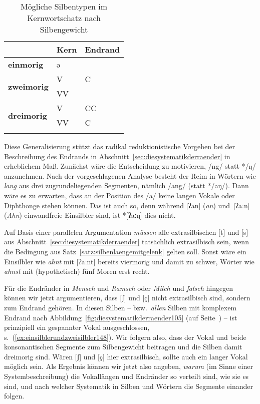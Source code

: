 \begin{table}[!htbp]
  \centering
  \begin{tabular}{lll}
    \lsptoprule
     & \textbf{Kern} & \textbf{Endrand} \\
    \midrule
    \textbf{einmorig} & ə & \\
    \midrule
    \multirow{2}{*}{\textbf{zweimorig}} & V & C \\
    & VV & \\
    \midrule
    \multirow{2}{*}{\textbf{dreimorig}} & V & CC \\
    & VV & C \\
    \lspbottomrule
  \end{tabular}
  \caption{Mögliche Silbentypen im Kernwortschatz nach Silbengewicht}
  \label{tab:einsilblerundzweisilbler147}
\end{table}

\Np

Diese Generalisierung stützt das radikal reduktionistische Vorgehen bei der Beschreibung des Endrands in Abschnitt~\ref{sec:diesystematikderraender} in erheblichem Maß.
Zunächst wäre die Entscheidung zu motivieren, /ng/ statt */ŋ/ anzunehmen.
Nach der vorgeschlagenen Analyse besteht der Reim in Wörtern wie \textit{lang} aus drei zugrundeliegenden Segmenten, nämlich /ang/ (statt */aŋ/).
Dann wäre es zu erwarten, dass an der Position des /a/ keine langen Vokale oder Diphthonge stehen können.
Das ist auch so, denn während [ʔan] (\textit{an}) und\ [ʔaːn] (\textit{Ahn}) einwandfreie Einsilbler sind, ist *[ʔaːŋ] dies nicht.

Auf Basis einer parallelen Argumentation \textit{müssen} alle extrasilbischen [t] und [s] aus Abschnitt~\ref{sec:diesystematikderraender} tatsächlich extrasilbisch sein, wenn die Bedingung aus Satz~\ref{satz:silbenlaengemitgelenk} gelten soll.
Sonst wäre ein Einsilbler wie \textit{ahnt} mit [ʔaːnt] bereits viermorig und damit zu schwer, Wörter wie \textit{ahnst} mit (hypothetisch) fünf Moren erst recht.

Für die Endränder in \textit{Mensch} und \textit{Ramsch} oder \textit{Milch} und \textit{falsch} hingegen können wir jetzt argumentieren, dass [ʃ] und [ç] nicht extrasilbisch sind, sondern zum Endrand gehören.
In diesen Silben -- bzw.\ \textit{allen} Silben mit komplexem Endrand nach Abbildung~\ref{fig:diesystematikderraender105} (auf Seite~\pageref{fig:diesystematikderraender105}) -- ist prinzipiell ein gespannter Vokal ausgeschlossen, s.\ (\ref{ex:einsilblerundzweisilbler148}).
Wir folgern also, dass der Vokal und beide konsonantischen Segmente zum Silbengewicht beitragen und die Silben damit dreimorig sind.
Wären [ʃ] und [ç] hier extrasilbisch, sollte auch ein langer Vokal möglich sein.
Als Ergebnis können wir jetzt also angeben, \textit{warum} (im Sinne einer Systembeschreibung) die Vokallängen und Endränder so verteilt sind, wie sie es sind, und nach welcher Systematik in Silben und Wörtern die Segmente einander folgen.

